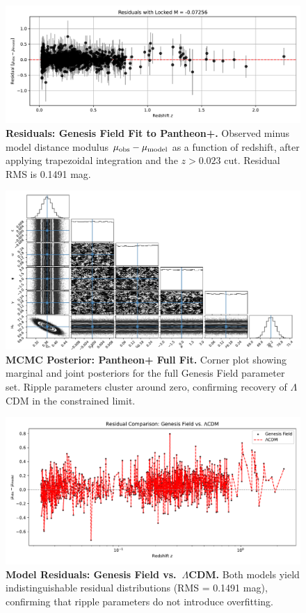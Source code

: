 \begin{figure}[htpb]
\centering
\includegraphics[width=\textwidth]{figures/sn_mcmc_residuals.pdf}
\caption{\textbf{Residuals: Genesis Field Fit to Pantheon+.} Observed minus model distance modulus $\mu_{\rm obs} - \mu_{\rm model}$ as a function of redshift, after applying trapezoidal integration and the $z > 0.023$ cut. Residual RMS is 0.1491 mag.}
\label{fig:residuals_pantheon}
\end{figure}

\begin{figure}[htpb]
\centering
\includegraphics[width=\textwidth]{figures/sn_corners.pdf}
\caption{\textbf{MCMC Posterior: Pantheon+ Full Fit.} Corner plot showing marginal and joint posteriors for the full Genesis Field parameter set. Ripple parameters cluster around zero, confirming recovery of $\Lambda$CDM in the constrained limit.}
\label{fig:corner_pantheon}
\end{figure}

\begin{figure}[htpb]
\centering
\includegraphics[width=\textwidth]{figures/residual_comparison.pdf}
\caption{\textbf{Model Residuals: Genesis Field vs.\ $\Lambda$CDM.} Both models yield indistinguishable residual distributions (RMS = 0.1491 mag), confirming that ripple parameters do not introduce overfitting.}
\label{fig:residual_comparison}
\end{figure}

